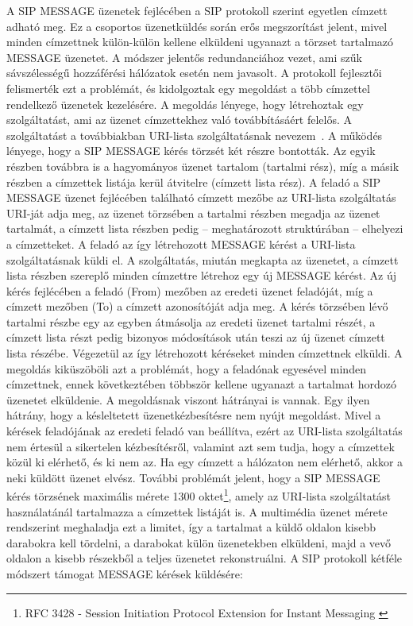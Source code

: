 A SIP MESSAGE üzenetek fejlécében a SIP protokoll szerint egyetlen címzett adható meg. Ez a csoportos üzenetküldés során erős megszorítást jelent, mivel minden címzettnek külön-külön kellene elküldeni ugyanazt a törzset tartalmazó MESSAGE üzenetet. A módszer jelentős redundanciához vezet, ami szűk sávszélességű hozzáférési hálózatok esetén nem javasolt. A protokoll fejlesztői felismerték ezt a problémát, és kidolgoztak egy megoldást a több címzettel rendelkező üzenetek kezelésére.
A megoldás lényege, hogy létrehoztak egy szolgáltatást, ami az üzenet címzettekhez való továbbításáért felelős. A szolgáltatást a továbbiakban URI-lista szolgáltatásnak nevezem~\cite{rfc5365}. A működés lényege, hogy a SIP MESSAGE kérés törzsét két részre bontották. Az egyik részben továbbra is a hagyományos üzenet tartalom (tartalmi rész), míg a másik részben a címzettek listája kerül átvitelre (címzett lista rész). A feladó a SIP MESSAGE üzenet fejlécében található címzett mezőbe az URI-lista szolgáltatás URI-ját adja meg, az üzenet törzsében a tartalmi részben megadja az üzenet tartalmát, a címzett lista részben pedig -- meghatározott struktúrában --  elhelyezi a címzetteket. A feladó az így létrehozott MESSAGE kérést a URI-lista szolgáltatásnak küldi el. A szolgáltatás, miután megkapta az üzenetet, a címzett lista részben szereplő minden címzettre létrehoz egy új MESSAGE kérést. Az új kérés fejlécében a feladó (From) mezőben az eredeti üzenet feladóját, míg a címzett mezőben (To) a címzett azonosítóját adja meg. A kérés törzsében lévő tartalmi részbe egy az egyben átmásolja az eredeti üzenet tartalmi részét, a címzett lista részt pedig bizonyos módosítások után teszi az új üzenet címzett lista részébe. Végezetül az így létrehozott kéréseket minden címzettnek elküldi. A megoldás kiküszöböli azt a problémát, hogy a feladónak egyesével minden címzettnek, ennek következtében többször kellene ugyanazt a tartalmat hordozó üzenetet elküldenie. A megoldásnak viszont hátrányai is vannak. Egy ilyen hátrány, hogy a késleltetett üzenetkézbesítésre nem nyújt megoldást. Mivel a kérések feladójának az eredeti feladó van beállítva, ezért az URI-lista szolgáltatás nem értesül a sikertelen kézbesítésről, valamint azt sem tudja, hogy a címzettek közül ki elérhető, és ki nem az. Ha egy címzett a hálózaton nem elérhető, akkor a neki küldött üzenet elvész. További problémát jelent, hogy a SIP MESSAGE kérés törzsének maximális mérete 1300 oktet\footnote{RFC 3428 - Session Initiation Protocol Extension for Instant Messaging \cite{rfc3428}}, amely az URI-lista szolgáltatást használatánál tartalmazza a címzettek listáját is. A multimédia üzenet mérete rendszerint meghaladja ezt a limitet, így a tartalmat a küldő oldalon kisebb darabokra kell tördelni, a darabokat külön üzenetekben elküldeni, majd a vevő oldalon a kisebb részekből a teljes üzenetet rekonstruálni. A SIP protokoll kétféle módszert támogat MESSAGE kérések küldésére:

